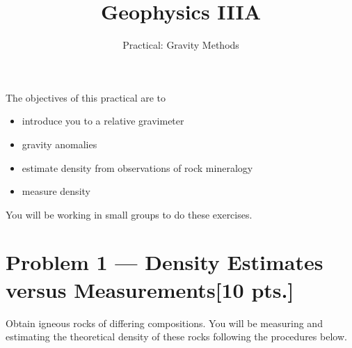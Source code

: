 \documentclass[11pt,a4paper,final]{article}
\title{Geophysics IIIA}
\author{Practical: Gravity Methods}
\begin{document}
\maketitle

The objectives of this practical are to
\begin{itemize}
    \item introduce you to a relative gravimeter
    \item gravity anomalies
    \item estimate density from observations of rock mineralogy
    \item measure density
\end{itemize}
You will be working in small groups to do these exercises.

\section*{Problem 1 --- Density Estimates versus Measurements\hfill [10 pts.]}
Obtain igneous rocks of differing compositions.  You will be measuring and estimating the theoretical density of these rocks following the procedures below.
\end{document}
